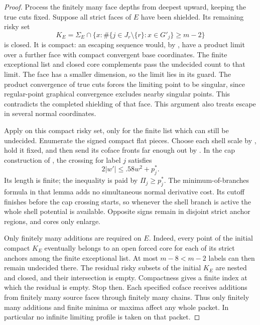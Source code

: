 \begin{proof}
Process the finitely many face depths from deepest upward, keeping the
true cuts fixed. Suppose all strict faces of $E$ have been shielded.
Its remaining risky set
\[
 K_E=\Sigma_E\cap
 \{x:\#\{j\in J_r\setminus\{r\}:x\in G'_j\}\ge m-2\}
\]
is closed. It is compact: an escaping sequence would, by
, have a product limit over a further face with
compact convergent base coordinates. The finite exceptional list and
closed core complements pass the undecided count to that limit.
The face has a smaller dimension, so the limit lies in its guard.
The product convergence of true cuts forces the limiting point to be
singular, since regular-point graphical convergence excludes nearby
singular points. This contradicts the completed shielding of that
face. This argument also treats escape in several normal coordinates.

Apply  on this compact
risky set, only for the finite list which can still be undecided.
Enumerate the signed compact flat pieces. Choose each shell scale by
, hold it fixed, and then send its coface fronts
far enough out by . In the cap construction
of , the crossing for label $j$ satisfies
\[
 2|w'|\le .58w^2+p_j^*.
\]
Its length is finite; the inequality is paid by $\Pi_j\ge p_j^*$.
The minimum-of-branches formula in that lemma adds no simultaneous
normal derivative cost. Its cutoff finishes before the cap crossing
starts, so whenever the shell branch is active the whole shell
potential is available. Opposite signs remain in disjoint strict
anchor regions, and cores only enlarge.

Only finitely many additions are required on $E$. Indeed, every point
of the initial compact $K_E$ eventually belongs to an open forced core
for each of its strict anchors among the finite exceptional list.
At most $m-8<m-2$ labels can then remain undecided there. The residual
risky subsets of the initial $K_E$ are nested and closed, and their
intersection is empty. Compactness gives a finite index at which the
residual is empty. Stop then. Each specified coface receives additions
from finitely many source faces through finitely many chains. Thus
only finitely many additions and finite minima or maxima affect any
whole packet. In particular no infinite limiting profile is taken on
that packet.


\end{proof}
